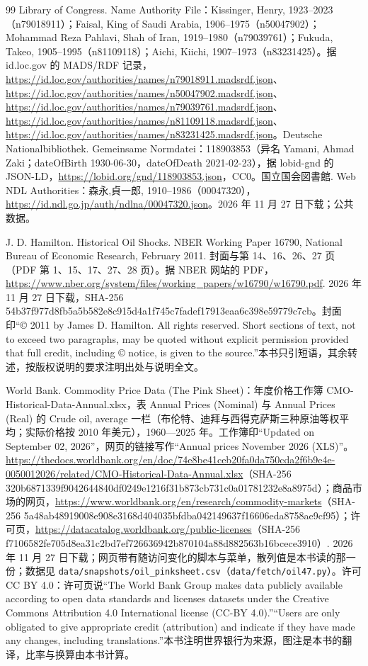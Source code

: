 \begin{thebibliography}{99}
 Library of Congress. Name Authority File：Kissinger, Henry, 1923--2023（n79018911）；Faisal, King of Saudi Arabia, 1906--1975（n50047902）；Mohammad Reza Pahlavi, Shah of Iran, 1919--1980（n79039761）；Fukuda, Takeo, 1905--1995（n81109118）；Aichi, Kiichi, 1907--1973（n83231425）。据 id.loc.gov 的 MADS/RDF 记录，\url{https://id.loc.gov/authorities/names/n79018911.madsrdf.json}、\url{https://id.loc.gov/authorities/names/n50047902.madsrdf.json}、\url{https://id.loc.gov/authorities/names/n79039761.madsrdf.json}、\url{https://id.loc.gov/authorities/names/n81109118.madsrdf.json}、\url{https://id.loc.gov/authorities/names/n83231425.madsrdf.json}。Deutsche Nationalbibliothek. Gemeinsame Normdatei：118903853（异名 Yamani, Ahmad Zaki；dateOfBirth 1930-06-30，dateOfDeath 2021-02-23），据 lobid-gnd 的 JSON-LD，\url{https://lobid.org/gnd/118903853.json}，CC0。国立国会図書館. Web NDL Authorities：森永,貞一郎, 1910--1986（00047320），\url{https://id.ndl.go.jp/auth/ndlna/00047320.json}。2026 年 11 月 27 日下载；公共数据。

 J. D. Hamilton. Historical Oil Shocks. NBER Working Paper 16790, National Bureau of Economic Research, February 2011. 封面与第 14、16、26、27 页（PDF 第 1、15、17、27、28 页）。据 NBER 网站的 PDF，\url{https://www.nber.org/system/files/working_papers/w16790/w16790.pdf}. 2026 年 11 月 27 日下载，SHA-256 54b37f977d8fb5a5b582e8c915d4a1f745c7fadef17913eaa6c398e59779c7cb。封面印“© 2011 by James D. Hamilton. All rights reserved. Short sections of text, not to exceed two paragraphs, may be quoted without explicit permission provided that full credit, including © notice, is given to the source.”本书只引短语，其余转述，按版权说明的要求注明出处与说明全文。

 World Bank. Commodity Price Data (The Pink Sheet)：年度价格工作簿 CMO-Historical-Data-Annual.xlsx，表 Annual Prices (Nominal) 与 Annual Prices (Real) 的 Crude oil, average 一栏（布伦特、迪拜与西得克萨斯三种原油等权平均；实际价格按 2010 年美元），1960—2025 年。工作簿印“Updated on September 02, 2026”，网页的链接写作“Annual prices November 2026 (XLS)”。\url{https://thedocs.worldbank.org/en/doc/74e8be41ceb20fa0da750cda2f6b9e4e-0050012026/related/CMO-Historical-Data-Annual.xlsx}（SHA-256 320b6871339f9042644840df0249e1216f31b873cb731c0a01781232e8a8975d）；商品市场的网页，\url{https://www.worldbank.org/en/research/commodity-markets}（SHA-256 5a48ab48919008e908e3168d404035bfdba042149637f16606eda8758ae9cf95）；许可页，\url{https://datacatalog.worldbank.org/public-licenses}（SHA-256 f7106582fe705d8ea31c2bd7ef726636942b870104a88d882563b16bcece3910）. 2026 年 11 月 27 日下载；网页带有随访问变化的脚本与菜单，散列值是本书读的那一份；数据见 \texttt{data/snapshots/oil\_pinksheet.csv}（\texttt{data/fetch/oil47.py}）。许可 CC BY 4.0：许可页说“The World Bank Group makes data publicly available according to open data standards and licenses datasets under the Creative Commons Attribution 4.0 International license (CC-BY 4.0).”“Users are only obligated to give appropriate credit (attribution) and indicate if they have made any changes, including translations.”本书注明世界银行为来源，图注是本书的翻译，比率与换算由本书计算。


\end{thebibliography}
